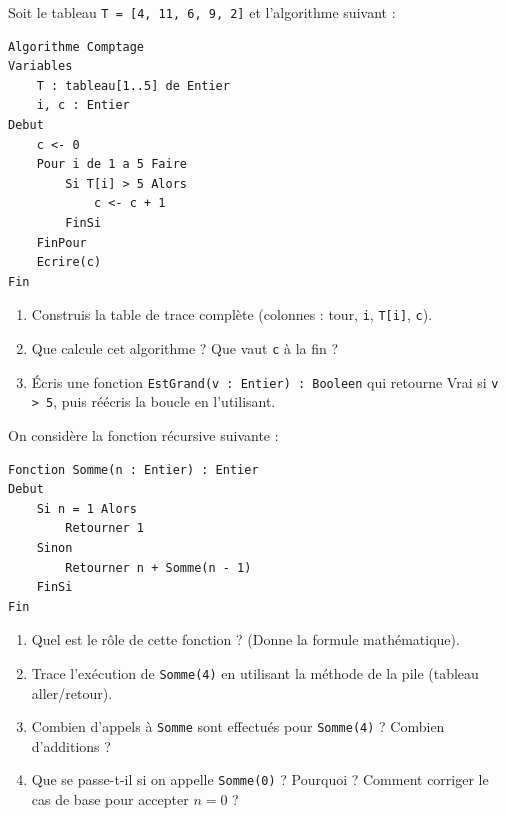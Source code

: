 \documentclass[11pt]{article}
\begin{document}
\begin{exercice}
Soit le tableau \texttt{T = [4, 11, 6, 9, 2]} et l'algorithme suivant :
\begin{lstlisting}
Algorithme Comptage
Variables
    T : tableau[1..5] de Entier
    i, c : Entier
Debut
    c <- 0
    Pour i de 1 a 5 Faire
        Si T[i] > 5 Alors
            c <- c + 1
        FinSi
    FinPour
    Ecrire(c)
Fin
\end{lstlisting}
\begin{enumerate}
  \item Construis la table de trace complète (colonnes : tour, \texttt{i}, \texttt{T[i]}, \texttt{c}).
  \item Que calcule cet algorithme ? Que vaut \texttt{c} à la fin ?
  \item Écris une fonction \texttt{EstGrand(v : Entier) : Booleen} qui retourne Vrai si \texttt{v > 5}, puis réécris la boucle en l'utilisant.
\end{enumerate}
\end{exercice}

\begin{exercice}
On considère la fonction récursive suivante :
\begin{lstlisting}
Fonction Somme(n : Entier) : Entier
Debut
    Si n = 1 Alors
        Retourner 1
    Sinon
        Retourner n + Somme(n - 1)
    FinSi
Fin
\end{lstlisting}
\begin{enumerate}
  \item Quel est le rôle de cette fonction ? (Donne la formule mathématique).
  \item Trace l'exécution de \texttt{Somme(4)} en utilisant la méthode de la pile (tableau aller/retour).
  \item Combien d'appels à \texttt{Somme} sont effectués pour \texttt{Somme(4)} ? Combien d'additions ?
  \item Que se passe-t-il si on appelle \texttt{Somme(0)} ? Pourquoi ? Comment corriger le cas de base pour accepter $n=0$ ?
\end{enumerate}
\end{exercice}
\end{document}
